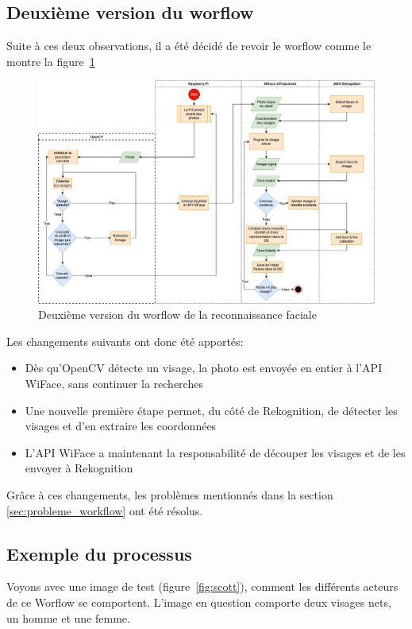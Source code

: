 \subsection{Deuxième version du worflow}
Suite à ces deux observations, il a été décidé de revoir le worflow comme le montre la figure~\ref{fig:worflow-reco2}

\clearpage
\newpage

\thispagestyle{empty}
\begin{landscape}
    \centering
\thispagestyle{empty}
\begin{figure}%
     \includegraphics[width=\linewidth]{images/facial_reco/flowchart_reco_v3.png}
     \caption{Deuxième version du worflow de la reconnaissance faciale}
     \label{fig:worflow-reco2}
\end{figure}
\end{landscape}

Les changements suivants ont donc été apportés:
\begin{itemize}
    \item Dès qu'OpenCV détecte un visage, la photo est envoyée en entier à l'API WiFace, sans continuer la recherches
    \item Une nouvelle première étape permet, du côté de Rekognition, de détecter les visages et d'en extraire les coordonnées
    \item L'API WiFace a maintenant la responsabilité de découper les visages et de les envoyer à Rekognition
\end{itemize}

Grâce à ces changements, les problèmes mentionnés dans la section \ref{sec:probleme_workflow} ont été résolus.
\subsection{Exemple du processus}
Voyons avec une image de test (figure~\ref{fig:scott}), comment les différents acteurs de ce Worflow se comportent.
L'image en question comporte deux visages nets, un homme et une femme.

